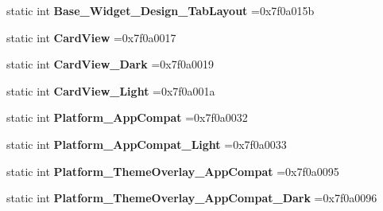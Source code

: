 \begin{DoxyCompactItemize}
static int {\bfseries Base\+\_\+\+Widget\+\_\+\+Design\+\_\+\+Tab\+Layout} =0x7f0a015b
\item 
\mbox{\label{classandroid_1_1support_1_1graphics_1_1drawable_1_1animated_1_1R_1_1style_ad7ca10fdf4a2f5716296254b1c8054b4}} 
static int {\bfseries Card\+View} =0x7f0a0017
\item 
\mbox{\label{classandroid_1_1support_1_1graphics_1_1drawable_1_1animated_1_1R_1_1style_a7b7a83ea2d8243b833a0bb164b5e277d}} 
static int {\bfseries Card\+View\+\_\+\+Dark} =0x7f0a0019
\item 
\mbox{\label{classandroid_1_1support_1_1graphics_1_1drawable_1_1animated_1_1R_1_1style_adbe80213dc7f9963b0abfb2fc6c63a16}} 
static int {\bfseries Card\+View\+\_\+\+Light} =0x7f0a001a
\item 
\mbox{\label{classandroid_1_1support_1_1graphics_1_1drawable_1_1animated_1_1R_1_1style_ac571fa0f0a1c406204e9fb2f07205f66}} 
static int {\bfseries Platform\+\_\+\+App\+Compat} =0x7f0a0032
\item 
\mbox{\label{classandroid_1_1support_1_1graphics_1_1drawable_1_1animated_1_1R_1_1style_adde20ae958f5f2e6fc0bda7ba4259879}} 
static int {\bfseries Platform\+\_\+\+App\+Compat\+\_\+\+Light} =0x7f0a0033
\item 
\mbox{\label{classandroid_1_1support_1_1graphics_1_1drawable_1_1animated_1_1R_1_1style_a11e4298a067d50b92caafa3f134dcd71}} 
static int {\bfseries Platform\+\_\+\+Theme\+Overlay\+\_\+\+App\+Compat} =0x7f0a0095
\item 
\mbox{\label{classandroid_1_1support_1_1graphics_1_1drawable_1_1animated_1_1R_1_1style_a628509d51058fc3dd3f31a546895274a}} 
static int {\bfseries Platform\+\_\+\+Theme\+Overlay\+\_\+\+App\+Compat\+\_\+\+Dark} =0x7f0a0096

\end{DoxyCompactItemize}
